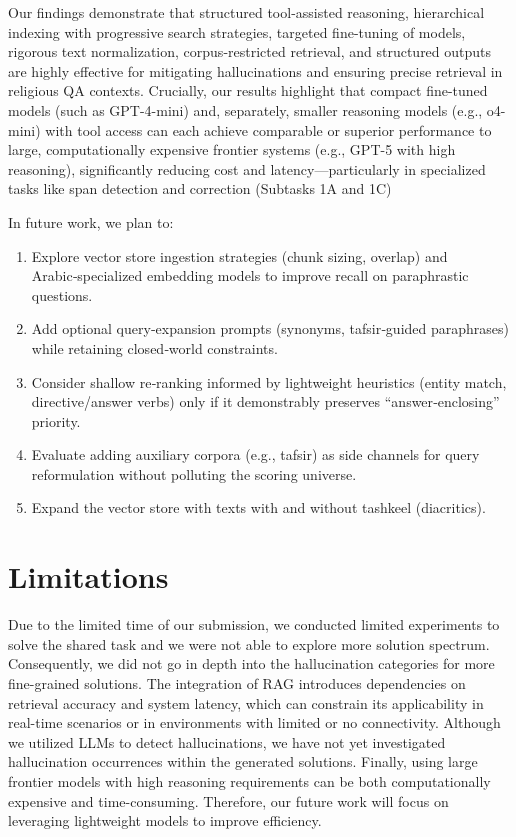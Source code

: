 \documentclass[11pt]{article}
\begin{document}
Our findings demonstrate that structured tool-assisted reasoning, hierarchical indexing with progressive search strategies, targeted fine-tuning of models, rigorous text normalization, corpus-restricted retrieval, and structured outputs are highly effective for mitigating hallucinations and ensuring precise retrieval in religious QA contexts. Crucially, our results highlight that compact fine-tuned models (such as GPT-4-mini) and, separately, smaller reasoning models (e.g., o4-mini) with tool access can each achieve comparable or superior performance to large, computationally expensive frontier systems (e.g., GPT-5 with high reasoning), significantly reducing cost and latency—particularly in specialized tasks like span detection and correction (Subtasks 1A and 1C)

In future work, we plan to:
\begin{enumerate}
    \item Explore vector store ingestion strategies (chunk sizing, overlap) and Arabic‑specialized embedding models to improve recall on paraphrastic questions.
    \item Add optional query‑expansion prompts (synonyms, tafsir‑guided paraphrases) while retaining closed‑world constraints.
    \item Consider shallow re‑ranking informed by lightweight heuristics (entity match, directive/answer verbs) only if it demonstrably preserves “answer‑enclosing” priority.
    \item Evaluate adding auxiliary corpora (e.g., tafsir) as side channels for query reformulation without polluting the scoring universe.
    \item Expand the vector store with texts with and without tashkeel (diacritics).
\end{enumerate}
\section*{Limitations}
Due to the limited time of our submission, we conducted limited experiments to solve the shared task and we were not able to explore more solution spectrum. Consequently, we did not go in depth into the hallucination categories for more fine-grained solutions.
The integration of RAG introduces dependencies on retrieval accuracy and system latency, which can constrain its applicability in real-time scenarios or in environments with limited or no connectivity. Although we utilized LLMs to detect hallucinations, we have not yet investigated hallucination occurrences within the generated solutions.
Finally, using large frontier models with high reasoning requirements can be both computationally expensive and time-consuming. Therefore, our future work will focus on leveraging lightweight models to improve efficiency.
\end{document}
